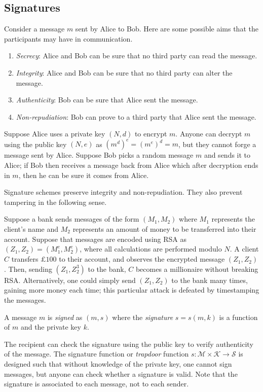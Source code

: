 \subsection{Signatures}
Consider a message \( m \) sent by Alice to Bob.
Here are some possible aims that the participants may have in communication.
\begin{enumerate}
    \item \emph{Secrecy}: Alice and Bob can be sure that no third party can read the message.
    \item \emph{Integrity}: Alice and Bob can be sure that no third party can alter the message.
    \item \emph{Authenticity}: Bob can be sure that Alice sent the message.
    \item \emph{Non-repudiation}: Bob can prove to a third party that Alice sent the message.
\end{enumerate}
\begin{example}
    Suppose Alice uses a private key \( (N, d) \) to encrypt \( m \).
    Anyone can decrypt \( m \) using the public key \( (N, e) \) as \( (m^d)^e = (m^e)^d = m \), but they cannot forge a message sent by Alice.
    Suppose Bob picks a random message \( m \) and sends it to Alice; if Bob then receives a message back from Alice which after decryption ends in \( m \), then he can be sure it comes from Alice.
\end{example}
Signature schemes preserve integrity and non-repudiation.
They also prevent tampering in the following sense.
\begin{example}
    Suppose a bank sends messages of the form \( (M_1, M_2) \) where \( M_1 \) represents the client's name and \( M_2 \) represents an amount of money to be transferred into their account.
    Suppose that messages are encoded using RSA as \( (Z_1, Z_2) = (M_1^e, M_2^e) \), where all calculations are performed modulo \( N \).
    A client \( C \) transfers \( \pounds 100 \) to their account, and observes the encrypted message \( (Z_1, Z_2) \).
    Then, sending \( (Z_1, Z_2^3) \) to the bank, \( C \) becomes a millionaire without breaking RSA.
    Alternatively, one could simply send \( (Z_1, Z_2) \) to the bank many times, gaining more money each time; this particular attack is defeated by timestamping the messages.
\end{example}
\begin{definition}
    A message \( m \) is \emph{signed} as \( (m, s) \) where the \emph{signature} \( s = s(m,k) \) is a function of \( m \) and the private key \( k \).
\end{definition}
The recipient can check the signature using the public key to verify authenticity of the message.
The signature function or \emph{trapdoor} function \( s \colon \mathcal M \times \mathcal K \to \mathcal S \) is designed such that without knowledge of the private key, one cannot sign messages, but anyone can check whether a signature is valid.
Note that the signature is associated to each message, not to each sender.
